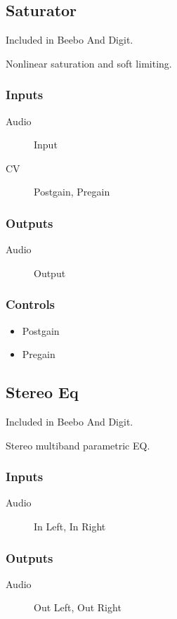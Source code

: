 \subsection{Saturator}

Included in Beebo And Digit.

Nonlinear saturation and soft limiting.



\subsubsection{Inputs}
\begin{description}
\item [Audio] Input
\item [CV] Postgain, Pregain
\end{description}

\subsubsection{Outputs}
\begin{description}
\item [Audio] Output
\end{description}

\subsubsection{Controls}
\begin{itemize}
\item Postgain
\item Pregain
\end{itemize}

\subsection{Stereo Eq}

Included in Beebo And Digit.

Stereo multiband parametric EQ.



\subsubsection{Inputs}
\begin{description}
\item [Audio] In Left, In Right
\end{description}

\subsubsection{Outputs}
\begin{description}
\item [Audio] Out Left, Out Right
\end{description}

